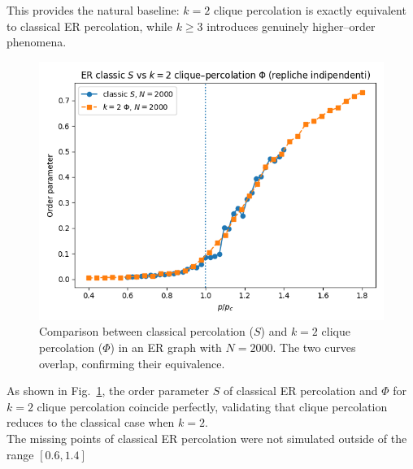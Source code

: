 This provides the natural baseline: $k=2$ clique percolation is exactly equivalent to 
classical ER percolation, while $k \geq 3$ introduces genuinely higher–order phenomena.

\begin{figure}[H]
    \centering
    \includegraphics[width=0.55\linewidth]{images/IMAGES TASK2/ER_classic_vs_k2_N2000.png}
    \caption{Comparison between classical percolation ($S$) and $k=2$ clique percolation 
    ($\Phi$) in an ER graph with $N=2000$. The two curves overlap, confirming their equivalence.}
    \label{fig:ER_k2}
\end{figure}

As shown in Fig.~\ref{fig:ER_k2}, the order parameter $S$ of classical ER percolation and 
$\Phi$ for $k=2$ clique percolation coincide perfectly, validating that clique percolation 
reduces to the classical case when $k=2$.\\
The missing points of classical ER percolation were not simulated outside of the range $[0.6, 1.4]$

